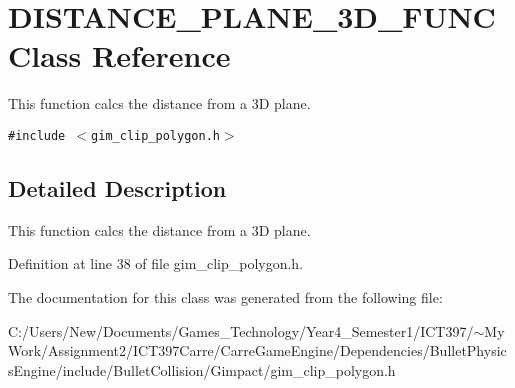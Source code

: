 \hypertarget{class_d_i_s_t_a_n_c_e___p_l_a_n_e__3_d___f_u_n_c}{
\section{DISTANCE\_\-PLANE\_\-3D\_\-FUNC Class Reference}
\label{class_d_i_s_t_a_n_c_e___p_l_a_n_e__3_d___f_u_n_c}
}
This function calcs the distance from a 3D plane.  


{\tt \#include $<$gim\_\-clip\_\-polygon.h$>$}



\subsection{Detailed Description}
This function calcs the distance from a 3D plane. 

Definition at line 38 of file gim\_\-clip\_\-polygon.h.

The documentation for this class was generated from the following file:\begin{CompactItemize}
\item 
C:/Users/New/Documents/Games\_\-Technology/Year4\_\-Semester1/ICT397/$\sim$My Work/Assignment2/ICT397Carre/CarreGameEngine/Dependencies/BulletPhysicsEngine/include/BulletCollision/Gimpact/gim\_\-clip\_\-polygon.h\end{CompactItemize}

